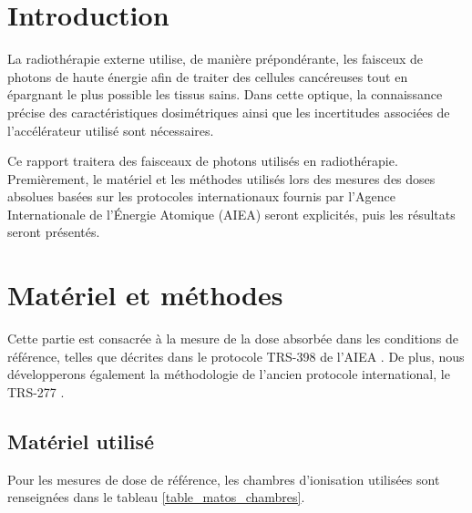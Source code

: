 \documentclass{article}
\begin{document}




\onehalfspacing

\pagestyle{fancy}
	\renewcommand\headrulewidth{0.5pt}
	\renewcommand\footrulewidth{0.5pt}
	\fancyfoot[R]{\thepage}

\tableofcontents
\clearpage
\section{Introduction}

La radiothérapie externe utilise, de manière prépondérante, les faisceux de photons de haute énergie afin de traiter des cellules cancéreuses tout en épargnant le plus possible les tissus sains. Dans cette optique, la connaissance précise des caractéristiques dosimétriques ainsi que les incertitudes associées de l'accélérateur utilisé sont nécessaires. 

Ce rapport traitera des faisceaux de photons utilisés en radiothérapie. Premièrement, le matériel et les méthodes utilisés lors des mesures des doses absolues basées sur les protocoles internationaux fournis par l'Agence Internationale de l'Énergie Atomique (AIEA) seront explicités, puis les résultats seront présentés. 

\section{Matériel et méthodes}

Cette partie est consacrée à la mesure de la dose absorbée dans les conditions de référence, telles que décrites dans le protocole TRS-398 de l'AIEA \cite{international2001iaea}. De plus, nous développerons également la méthodologie de l'ancien protocole international, le TRS-277 \cite{internationaliaea}.

\subsection{Matériel utilisé}

Pour les mesures de dose de référence, les chambres d'ionisation utilisées sont renseignées dans le tableau \ref*{table_matos_chambres}.
\end{document}
